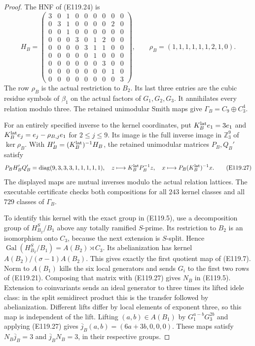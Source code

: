 \begin{proof}
The HNF of (E119.24) is
\[
 H_B=\begin{pmatrix}
 3&0&1&0&0&0&0&0&0\\
 0&3&1&0&0&0&0&2&0\\
 0&0&1&0&0&0&0&0&0\\
 0&0&0&3&0&1&2&0&0\\
 0&0&0&0&3&1&1&0&0\\
 0&0&0&0&0&1&0&0&0\\
 0&0&0&0&0&0&3&0&0\\
 0&0&0&0&0&0&0&1&0\\
 0&0&0&0&0&0&0&0&3
 \end{pmatrix},\qquad
 \rho_B=(1,1,1,1,1,1,2,1,0).
 \tag{E119.26}
\]
The row $\rho_B$ is the actual restriction to $B_2$.
Its last three entries are the cubic residue symbols of
$\beta_1$ on the actual factors of $G_1,G_2,G_3$.
It annihilates every relation modulo three.
The retained unimodular Smith maps give
$\Gamma_B=C_9\oplus C_3^4$.

For an entirely specified inverse to the kernel coordinates,
put $K_B^{\rm lat}e_1=3e_1$ and
$K_B^{\rm lat}e_j=e_j-\rho_{B,j}e_1$ for $2\leq j\leq9$.
Its image is the full inverse image in $\mathbb Z_3^9$ of
$\ker\rho_B$. With $H'_B=(K_B^{\rm lat})^{-1}H_B$, the
retained unimodular matrices $P_B,Q_B'$ satisfy
\[
 P_BH'_BQ_B'=\operatorname{diag}(9,3,3,3,1,1,1,1,1),
 \quad
 z\longmapsto K_B^{\rm lat}P_B^{-1}z,\quad
 x\longmapsto P_B(K_B^{\rm lat})^{-1}x.
 \tag{E119.27}
\]
The displayed maps are mutual inverses modulo the actual relation
lattices. The executable certificate checks both compositions for
all $243$ kernel classes and all $729$ classes of $\Gamma_B$.

To identify this kernel with the exact group in (E119.5), use
a decomposition group of $H^S_{B_2}/B_1$ above any totally ramified
$S$-prime. Its restriction to $B_2$ is an isomorphism onto $C_3$,
because the next extension is $S$-split. Hence
$\operatorname{Gal}(H^S_{B_2}/B_1)=A(B_2)\rtimes C_3$.
Its abelianization has kernel $A(B_2)/(\sigma-1)A(B_2)$.
This gives exactly the first quotient map of (E119.7).
Norm to $A(B_1)$ kills the six local generators and sends
$G_i$ to the first two rows of (E119.21).
Composing that matrix with (E119.27) gives $N_B$ in (E119.5).
Extension to coinvariants sends an ideal generator to three times
its lifted idele class: in the split semidirect product this is
the transfer followed by abelianization. Different lifts differ
by local elements of exponent three, so this map is independent
of the lift. Lifting $(a,b)\in A(B_1)$ by
$G_1^{a-b}G_3^{2b}$ and applying (E119.27) gives
$\overline j_B(a,b)=(6a+3b,0,0,0)$.
These maps satisfy $N_B\overline j_B=3$ and
$\overline j_BN_B=3$, in their respective groups.


\end{proof}
